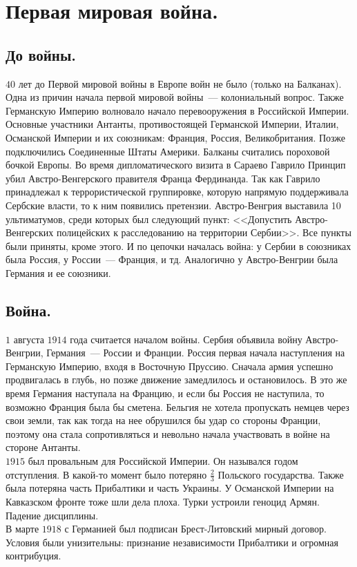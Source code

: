 \documentclass[12pt]{article}
\begin{document}
	\tableofcontents
	\setcounter{tocdepth}{3}
	\newpage
	\section{Первая мировая война.}
	\subsection{До войны.}
	$40$ лет до Первой мировой войны в Европе войн не было (только на Балканах). Одна из причин начала первой мировой войны~--- колониальный вопрос. Также Германскую Империю волновало начало перевооружения в Российской Империи. Основные участники Антанты, противостоящей Германской Империи, Италии, Османской Империи и их союзникам: Франция, Россия, Великобритания. Позже подключились Соединенные Штаты Америки. Балканы считались пороховой бочкой Европы. Во время дипломатического визита в Сараево Гаврило Принцип убил Австро-Венгерского правителя Франца Фердинанда. Так как Гаврило принадлежал к террористической группировке, которую напрямую поддерживала Сербские власти, то к ним появились претензии. Австро-Венгрия выставила 10 ультиматумов, среди которых был следующий пункт: <<Допустить Австро-Венгерских полицейских к расследованию на территории Сербии>>. Все пункты были приняты, кроме этого. И по цепочки началась война: у Сербии в союзниках была Россия, у России~--- Франция, и тд. Аналогично у Австро-Венгрии была Германия и ее союзники.
	\subsection{Война.}
	$1$ августа $1914$ года считается началом войны. Сербия объявила войну Австро-Венгрии, Германия~--- России и Франции. Россия первая начала наступления на Германскую Империю, входя в Восточную Пруссию. Сначала армия успешно продвигалась в глубь, но позже движение замедлилось и остановилось. В это же время Германия наступала на Францию, и если бы Россия не наступила, то возможно Франция была бы сметена. Бельгия не хотела пропускать немцев через свои земли, так как тогда на нее обрушился бы удар со стороны Франции, поэтому она стала сопротивляться и невольно начала участвовать в войне на стороне Антанты. \\
	$1915$ был провальным для Российской Империи. Он назывался годом отступления. В какой-то момент было потеряно $\frac{2}{3}$ Польского государства. Также была потеряна часть Прибалтики и часть Украины. У Османской Империи на Кавказском фронте тоже шли дела плоха. Турки устроили геноцид Армян. Падение дисциплины. \\
	В марте $1918$ с Германией был подписан Брест-Литовский мирный договор. Условия были унизительны: признание независимости Прибалтики и огромная контрибуция.
\end{document}

